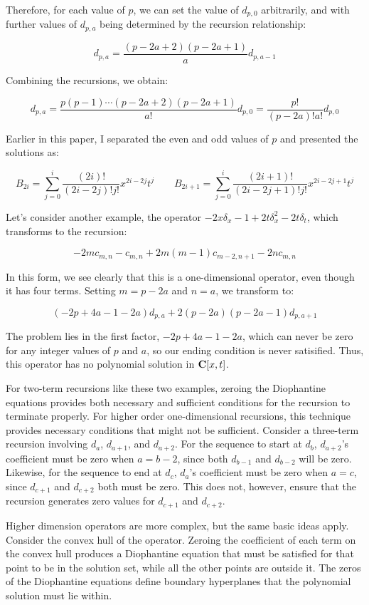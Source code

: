 \documentclass{article}
\newcommand{\C}{\ensuremath{{\bf C}}}
\begin{document}
Therefore, for each value of $p$, we can set the value of $d_{p,0}$
arbitrarily, and with further values of $d_{p,a}$ being determined
by the recursion relationship:

$$d_{p,a} = \frac{(p-2a+2)(p-2a+1)}{a} d_{p,a-1}$$

Combining the recursions, we obtain:

$$d_{p,a} = \frac{p(p-1)\cdots(p-2a+2)(p-2a+1)}{a!} d_{p,0} = \frac{p!}{(p-2a)!a!} d_{p,0}$$

Earlier in this paper, I separated the even and odd values of $p$ and presented the solutions as:

$$B_{2i} = \sum_{j=0}^i \frac{(2i)!}{(2i-2j)!j!} x^{2i-2j} t^{j}
\qquad B_{2i+1} = \sum_{j=0}^i \frac{(2i+1)!}{(2i-2j+1)!j!} x^{2i-2j+1} t^{j}$$

Let's consider another example, the operator $-2x\delta_x - 1 +2t\delta_x^2 - 2t\delta_t$,
which transforms to the recursion:

$$-2m c_{m,n} - c_{m,n} + 2m(m-1)c_{m-2,n+1} - 2nc_{m,n}$$

In this form, we see clearly that this is a one-dimensional operator, even though it
has four terms.  Setting $m=p-2a$ and $n=a$, we transform to:

$$(-2p+4a-1-2a)d_{p,a} + 2(p-2a)(p-2a-1)d_{p,a+1}$$

The problem lies in the first factor, $-2p+4a-1-2a$, which can never be zero for
any integer values of $p$ and $a$, so our ending condition is never satisified.
Thus, this operator has no polynomial solution in $\C[x,t]$.

For two-term recursions like these two examples, zeroing the
Diophantine equations provides both necessary and sufficient
conditions for the recursion to terminate properly.  For higher order
one-dimensional recursions, this technique provides necessary
conditions that might not be sufficient.  Consider a three-term
recursion involving $d_a$, $d_{a+1}$, and $d_{a+2}$.  For the sequence
to start at $d_b$, $d_{a+2}$'s coefficient must be zero when $a=b-2$,
since both $d_{b-1}$ and $d_{b-2}$ will be zero.  Likewise, for the
sequence to end at $d_c$, $d_a$'s coefficient must be zero when $a=c$,
since $d_{c+1}$ and $d_{c+2}$ both must be zero.  This does not,
however, ensure that the recursion generates zero values for $d_{c+1}$
and $d_{c+2}$.

Higher dimension operators are more complex, but the same basic ideas
apply.  Consider the convex hull of the operator.  Zeroing the
coefficient of each term on the convex hull produces a Diophantine
equation that must be satisfied for that point to be in the solution
set, while all the other points are outside it.  The zeros of the
Diophantine equations define boundary hyperplanes that the polynomial
solution must lie within.
\end{document}
